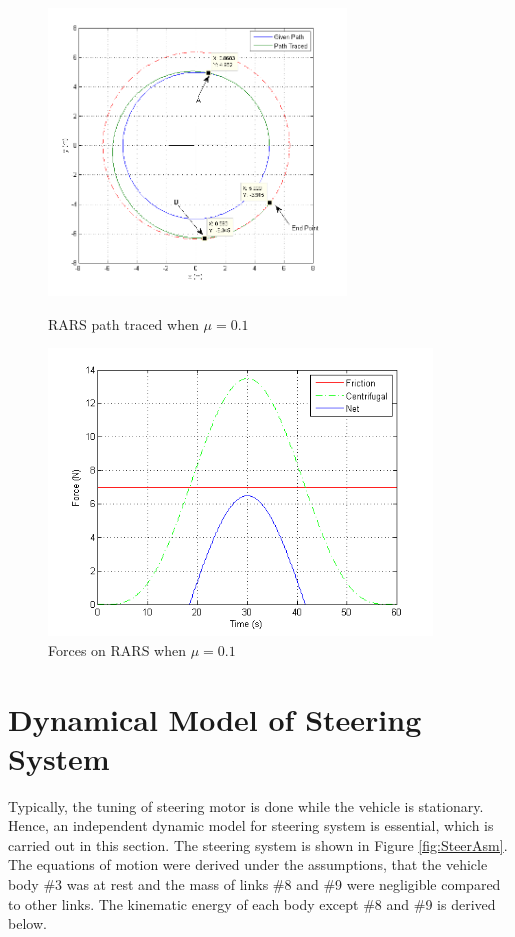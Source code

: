 \begin{figure}
	\begin{minipage}[t]{0.5\textwidth}
		\centering
		\includegraphics[height=3in]{Chapter4/fig/PathWithMu-1slip}
		\caption{RARS path traced when $\mu=0.1$}\label{fig:pathWithMu1}
	\end{minipage}
	\hfill
	\begin{minipage}[t]{0.5\textwidth}
		\centering
		\includegraphics[height=3in,width=\textwidth]{Chapter4/fig/ForceMu-1}
		\caption{Forces on RARS when $\mu=0.1$ }\label{fig:ForcesMu1}
	\end{minipage}
\end{figure}
\section{Dynamical Model of Steering System}
Typically, the tuning of steering motor is done while the vehicle is stationary. Hence, an independent dynamic model for steering system is essential, which is carried out in this section. 
The  steering system is shown in Figure \ref{fig:SteerAsm}. The equations of motion were derived under the assumptions,  that the vehicle body \#3 was at rest and  the mass of links \#8 and \#9 were negligible compared to other links. The kinematic energy of each body except \#8 and \#9 is derived below.

